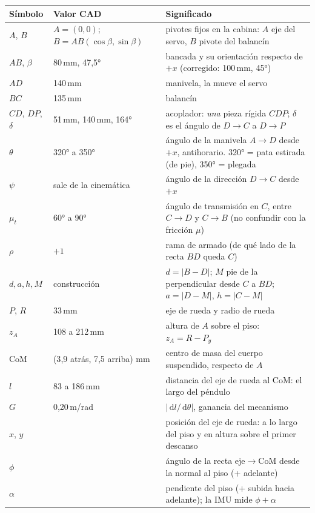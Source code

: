 \documentclass[11pt,a4paper]{article}
\newcommand{\dd}{\,\mathrm{d}}
\begin{document}
\begin{table}[H]
  \centering\small
  \begin{tabular}{llp{8.6cm}}
    \toprule
    Símbolo & Valor CAD & Significado \\
    \midrule
    $A$, $B$ & $A=(0,0)$; $B = AB(\cos\beta,\sin\beta)$ & pivotes fijos en la cabina: $A$ eje del servo, $B$ pivote del balancín \\
    $AB$, $\beta$ & 80\,mm, 47{,}5° & bancada y su orientación respecto de $+x$ (corregido: 100\,mm, 45°) \\
    $AD$ & 140\,mm & manivela, la mueve el servo \\
    $BC$ & 135\,mm & balancín \\
    $CD$, $DP$, $\delta$ & 51\,mm, 140\,mm, 164° & acoplador: \emph{una} pieza rígida $CDP$; $\delta$ es el ángulo de $D\!\to\!C$ a $D\!\to\!P$ \\
    $\theta$ & 320° a 350° & ángulo de la manivela $A\!\to\!D$ desde $+x$, antihorario. 320° = pata estirada (de pie), 350° = plegada \\
    $\psi$ & sale de la cinemática & ángulo de la dirección $D\!\to\!C$ desde $+x$ \\
    $\mu_t$ & 60° a 90° & ángulo de transmisión en $C$, entre $C\!\to\!D$ y $C\!\to\!B$ (no confundir con la fricción $\mu$) \\
    $\rho$ & $+1$ & rama de armado (de qué lado de la recta $BD$ queda $C$) \\
    $d, a, h, M$ & construcción & $d = |B-D|$; $M$ pie de la perpendicular desde $C$ a $BD$; $a = |D-M|$, $h = |C-M|$ \\
    $P$, $R$ & 33\,mm & eje de rueda y radio de rueda \\
    $z_A$ & 108 a 212\,mm & altura de $A$ sobre el piso: $z_A = R - P_y$ \\
    $\mathrm{CoM}$ & (3{,}9 atrás, 7{,}5 arriba) mm & centro de masa del cuerpo suspendido, respecto de $A$ \\
    $l$ & 83 a 186\,mm & distancia del eje de rueda al CoM: el largo del péndulo \\
    $G$ & 0{,}20\,m/rad & $|\dd l/\dd\theta|$, ganancia del mecanismo \\
    \midrule
    $x$, $y$ & & posición del eje de rueda: a lo largo del piso y en altura sobre el primer descanso \\
    $\phi$ & & ángulo de la recta eje$\to$CoM desde la normal al piso (+ adelante) \\
    $\alpha$ & & pendiente del piso (+ subida hacia adelante); la IMU mide $\phi+\alpha$ \\

\end{tabular}
\end{table}
\end{document}
